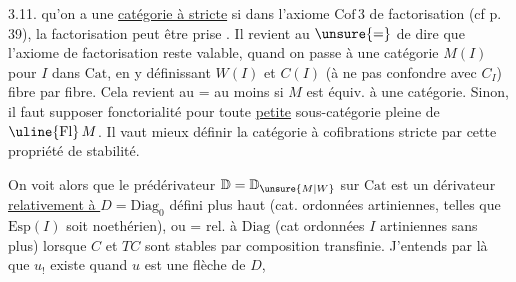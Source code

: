 
3.11.  qu'on a une \uline{catégorie à 
stricte} si dans l'axiome $\mathrm{Cof}\,3$ de factorisation
(cf p. 39), la factorisation peut être prise
. Il revient \inserted{$\pm$} au $\unsure{=}$ de dire que
l'axiome de factorisation reste valable,
quand on passe à une catégorie $M(I)$
pour $I$ dans $\mathrm{Cat}$, en y définissant $W(I)$ et
$C(I)$ (à ne pas confondre avec $C_I$) fibre par
fibre. Cela revient au $\mathord{=}$  au moins si
$M$ est équiv. à une  catégorie. Sinon,
il faut supposer fonctorialité pour toute
\uline{petite} sous-catégorie pleine de $\uline{\mathrm{Fl}}\,M$.
Il vaut mieux définir la catégorie à cofibrations
stricte par cette propriété de stabilité.

On voit alors que le prédérivateur
$\mathbb{D}=\mathbb{D}_{\unsure{M|W}}$  sur $\mathrm{Cat}$ est  un dérivateur
\uline{relativement à $D=\mathrm{Diag}_0$} défini plus haut
(cat. ordonnées  artiniennes, telles que $\mathrm{Esp}(I)$
soit noethérien), ou $\mathord{=}$ rel. à $\mathrm{Diag}$ (cat
ordonnées $I$ artiniennes sans plus)
lorsque $C$ et $TC$ sont stables par composition
transfinie. J'entends par là que
$u_!$ existe quand $u$ est une flèche de $D$,
